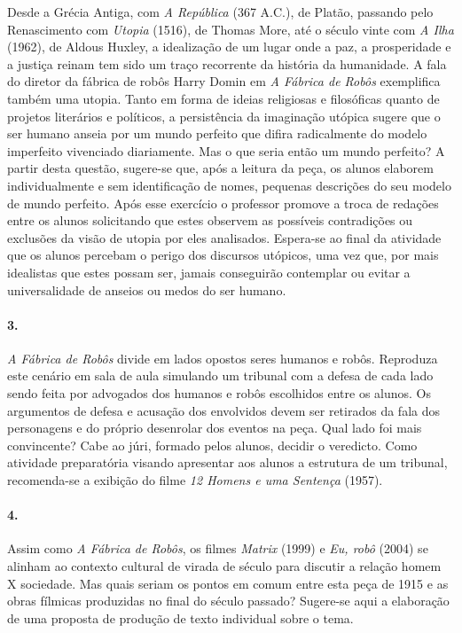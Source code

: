\documentclass[11pt]{hedrabook}
\begin{document}
Desde a Grécia Antiga, com \textit{A República} (367 A.C.), de Platão,
passando pelo Renascimento com \textit{Utopia} (1516), de Thomas More, até o
século vinte com \textit{A Ilha} (1962), de Aldous Huxley, a idealização de um
lugar onde a paz, a prosperidade e a justiça reinam tem sido um traço
recorrente da história da humanidade. A fala do diretor da fábrica de robôs
Harry Domin em \textit{A Fábrica de Robôs} exemplifica também uma utopia. Tanto
em forma de ideias religiosas e filosóficas quanto de projetos literários e
políticos, a persistência da imaginação utópica sugere que o ser humano anseia
por um mundo perfeito que difira radicalmente do modelo imperfeito vivenciado
diariamente. Mas o que seria então um mundo perfeito? A partir desta questão,
sugere-se que, após a leitura da peça, os alunos elaborem individualmente e sem
identificação de nomes, pequenas descrições do seu modelo de mundo perfeito.
Após esse exercício o professor promove a troca de redações entre os alunos
solicitando que estes observem as possíveis contradições ou exclusões da visão
de utopia por eles analisados. Espera-se ao final da atividade que os alunos
percebam o perigo dos discursos utópicos, uma vez que, por mais idealistas que
estes possam ser, jamais conseguirão contemplar ou evitar a universalidade de
anseios ou medos do ser humano. 


\paragraph{3.}

\textit{A Fábrica de Robôs} divide em lados opostos seres humanos e robôs.
Reproduza este cenário em sala de aula simulando um tribunal com a defesa de
cada lado sendo feita por advogados dos humanos e robôs escolhidos entre os
alunos. Os argumentos de defesa e acusação dos envolvidos devem ser retirados
da fala dos personagens e do próprio desenrolar dos eventos na peça. Qual lado
foi mais convincente? Cabe ao júri, formado pelos alunos, decidir o veredicto.
Como atividade preparatória visando apresentar aos alunos a estrutura de um
tribunal, recomenda-se a exibição do filme \textit{12 Homens e uma Sentença}
(1957).  


\paragraph{4.}

Assim como \textit{A Fábrica de Robôs}, os filmes \textit{Matrix} (1999) e
\textit{Eu, robô} (2004) se alinham ao contexto cultural de virada de século
para discutir a relação homem X sociedade.  Mas quais seriam os pontos em comum
entre esta peça de 1915 e as obras fílmicas produzidas no final do século
passado? Sugere-se aqui a elaboração de uma proposta de produção de texto
individual sobre o tema.
\end{document}
